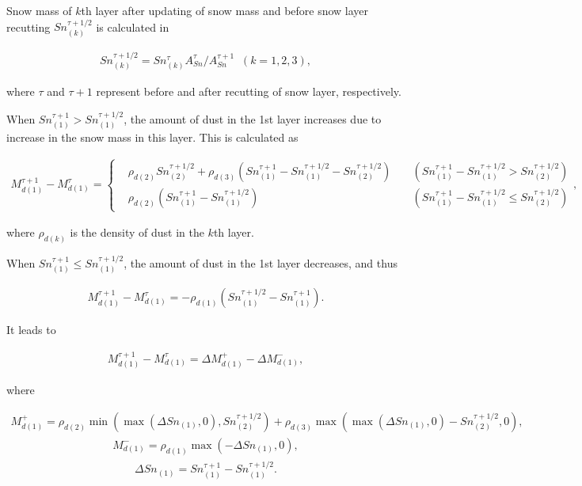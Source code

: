 Snow mass of \(k\)th layer after updating of snow mass and before snow layer recutting \(Sn^{\tau+1/2}_{(k)}\) is calculated in

\begin{eqnarray}
Sn^{\tau+1/2}_{(k)} = Sn^{\tau}_{(k)} A_{Sn}^{\tau} / A_{Sn}^{\tau+1} \;\; (k = 1, 2, 3), \label{8-48}
\end{eqnarray}

where \(\tau\) and \(\tau+1\) represent before and after recutting of snow layer, respectively.

When \(Sn^{\tau+1}_{(1)} > Sn^{\tau+1/2}_{(1)}\), the amount of dust in the 1st layer increases due to increase in the snow mass in this layer. This is calculated as

\begin{eqnarray}
M_{d(1)}^{\tau+1} - M_{d(1)}^{\tau}
 = \left\{ \begin{aligned}
 & \rho_{d(2)} Sn^{\tau+1/2}_{(2)}
 + \rho_{d(3)} \left( Sn^{\tau+1}_{(1)} - Sn^{\tau+1/2}_{(1)} - Sn^{\tau+1/2}_{(2)} \right)
 \; && \left( Sn^{\tau+1}_{(1)} - Sn^{\tau+1/2}_{(1)} > Sn^{\tau+1/2}_{(2)} \right) \\
 & \rho_{d(2)} \left( Sn^{\tau+1}_{(1)} - Sn^{\tau+1/2}_{(1)} \right)
 \; && \left( Sn^{\tau+1}_{(1)} - Sn^{\tau+1/2}_{(1)} \leq Sn^{\tau+1/2}_{(2)} \right)
\end{aligned} \right., \label{8-49}
\end{eqnarray}

where \(\rho_{d(k)}\) is the density of dust in the \(k\)th layer.

When \(Sn^{\tau+1}_{(1)} \leq Sn^{\tau+1/2}_{(1)}\), the amount of dust in the 1st layer decreases, and thus

\begin{eqnarray}
M_{d(1)}^{\tau+1} - M_{d(1)}^{\tau}
 = -\rho_{d(1)} \left( Sn^{\tau+1/2}_{(1)} - Sn^{\tau+1}_{(1)} \right). \label{8-50}
\end{eqnarray}

It leads to

\begin{eqnarray}
M_{d(1)}^{\tau+1} - M_{d(1)}^{\tau} = \Delta M_{d(1)}^{+} - \Delta M_{d(1)}^{-}, \label{8-51}
\end{eqnarray}

where

\begin{eqnarray}
M_{d(1)}^{+}
 = \rho_{d(2)} \min\left( \max\left( \Delta Sn_{(1)}, 0 \right), Sn_{(2)}^{\tau+1/2} \right)
 + \rho_{d(3)} \max\left( \max\left( \Delta Sn_{(1)}, 0 \right) - Sn_{(2)}^{\tau+1/2}, 0 \right),
\label{8-52}
\end{eqnarray} \begin{eqnarray}
M_{d(1)}^{-}
 = \rho_{d(1)} \max\left( -\Delta Sn_{(1)}, 0 \right),  \label{8-53}
\end{eqnarray} \begin{eqnarray}
\Delta Sn_{(1)}
 = Sn_{(1)}^{\tau+1} - Sn_{(1)}^{\tau+1/2}. \label{8-54}
\end{eqnarray}

